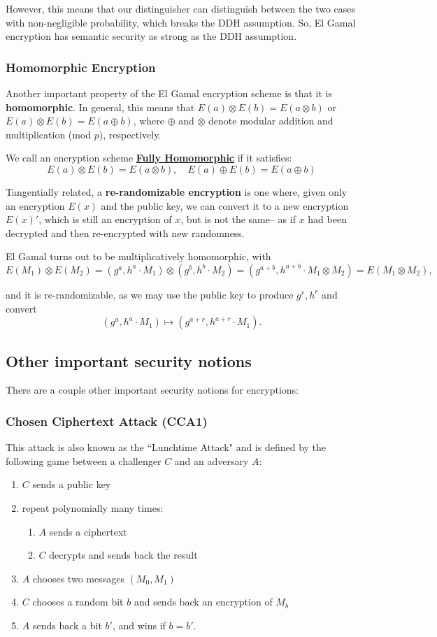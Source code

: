 \documentclass[11pt]{article}
\newcommand{\tb}{\textbf}
\newcommand{\ul}{\underline}
\begin{document}
However, this means that our distinguisher can distinguish between the two cases with non-negligible probability, which breaks the DDH assumption.
So, El Gamal encryption has semantic security as strong as the DDH assumption.

\subsubsection{Homomorphic Encryption}

Another important property of the El Gamal encryption scheme is that it is \tb{homomorphic}.
In general, this means that \(E(a)\otimes E(b) = E(a\otimes b)\) or \(E(a)\otimes E(b) = E(a\oplus b)\),
where \(\oplus\) and \(\otimes\) denote modular addition and multiplication (mod \(p\)), respectively.\medskip

We call an encryption scheme \tb{\ul{Fully Homomorphic}} if it satisfies:
\[E(a)\otimes E(b)=E(a\otimes b),\quad E(a)\oplus E(b) =E(a\oplus b)\]\medskip

Tangentially related, a \tb{re-randomizable encryption} is one where, given only an encryption \(E(x)\) and the public key, 
we can convert it to a new encryption \(E(x)'\), which is still an encryption of \(x\), but is not the same--
as if \(x\) had been decrypted and then re-encrypted with new randomness.\bigskip

El Gamal turns out to be multiplicatively homomorphic, with 
\[E(M_1)\otimes E(M_2) = (g^a,h^a\cdot M_1)\otimes (g^b,h^b\cdot M_2) = (g^{a+b}, h^{a+b}\cdot M_1\otimes M_2) = E(M_1\otimes M_2),\]

and it is re-randomizable, as we may use the public key to produce \(g^r, h^r\) and convert 
\[(g^a,h^a\cdot M_1)\mapsto (g^{a+r}, h^{a+r}\cdot M_1).\]


\newpage
\subsection{Other important security notions}
There are a couple other important security notions for encryptions:

\subsubsection{Chosen Ciphertext Attack (CCA1)}
This attack is also known as the ``Lunchtime Attack" and is defined by the following game between a challenger \(C\) and an adversary \(A\):
\begin{enumerate}
\item \(C\) sends a public key
\item repeat polynomially many times:
\begin{enumerate}
\item \(A\) sends a ciphertext
\item \(C\) decrypts and sends back the result
\end{enumerate}
\item \(A\) chooses two messages \((M_0, M_1)\)
\item \(C\) chooses a random bit \(b\) and sends back an encryption of \(M_b\)
\item \(A\) sends back a bit \(b'\), and wins if \(b=b'\). 
\end{enumerate}
\end{document}
